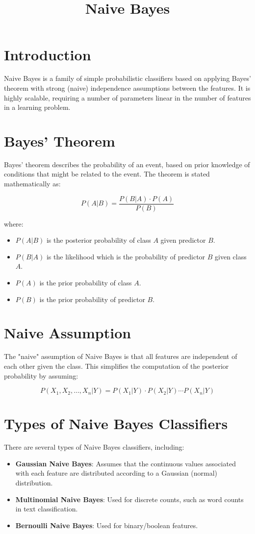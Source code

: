 \documentclass{article}
\title{Naive Bayes}
\author{}
\date{}
\begin{document}
\maketitle

\section{Introduction}
Naive Bayes is a family of simple probabilistic classifiers based on applying Bayes' theorem with strong (naive) independence assumptions between the features. It is highly scalable, requiring a number of parameters linear in the number of features in a learning problem.

\section{Bayes' Theorem}
Bayes' theorem describes the probability of an event, based on prior knowledge of conditions that might be related to the event. The theorem is stated mathematically as:

\[
P(A|B) = \frac{P(B|A) \cdot P(A)}{P(B)}
\]

where:
\begin{itemize}
    \item \( P(A|B) \) is the posterior probability of class \( A \) given predictor \( B \).
    \item \( P(B|A) \) is the likelihood which is the probability of predictor \( B \) given class \( A \).
    \item \( P(A) \) is the prior probability of class \( A \).
    \item \( P(B) \) is the prior probability of predictor \( B \).
\end{itemize}

\section{Naive Assumption}
The "naive" assumption of Naive Bayes is that all features are independent of each other given the class. This simplifies the computation of the posterior probability by assuming:

\[
P(X_1, X_2, \ldots, X_n | Y) = P(X_1 | Y) \cdot P(X_2 | Y) \cdots P(X_n | Y)
\]

\section{Types of Naive Bayes Classifiers}
There are several types of Naive Bayes classifiers, including:
\begin{itemize}
    \item \textbf{Gaussian Naive Bayes}: Assumes that the continuous values associated with each feature are distributed according to a Gaussian (normal) distribution.
    \item \textbf{Multinomial Naive Bayes}: Used for discrete counts, such as word counts in text classification.
    \item \textbf{Bernoulli Naive Bayes}: Used for binary/boolean features.
\end{itemize}
\end{document}
